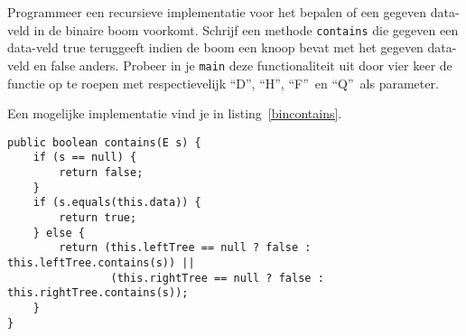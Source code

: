 \begin{oef}
\code Programmeer een recursieve implementatie voor het bepalen of een gegeven data-veld in de binaire boom voorkomt. Schrijf een methode \verb=contains= die gegeven een data-veld true teruggeeft indien de boom een knoop bevat met het gegeven data-veld en false anders. Probeer in je \verb+main+ deze functionaliteit uit door vier keer de functie op te roepen met respectievelijk “D”, “H”, “F”\ en “Q”\ als parameter.
\begin{opl}
Een mogelijke implementatie vind je in listing~\ref{bincontains}.
\begin{lstlisting}[caption={Komt een bepaalde waarde voor in een boom?}, label=bincontains]
public boolean contains(E s) {
	if (s == null) {
		return false;
	}
	if (s.equals(this.data)) {
		return true;
	} else {
		return (this.leftTree == null ? false : this.leftTree.contains(s)) ||
				(this.rightTree == null ? false : this.rightTree.contains(s));
	}
}
\end{lstlisting}

\end{opl}
\end{oef}



